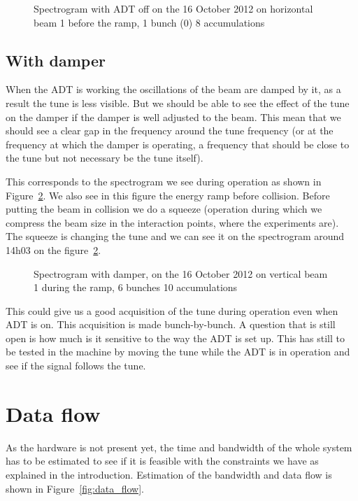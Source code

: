 \begin{figure}[H]
\caption{Spectrogram with ADT off on the 16 October 2012 on horizontal beam 1 before the ramp, 1 bunch (0) 8 accumulations}
\label{fig:bunch_0_adt_off}
\centering
\end{figure}

\subsection{With damper}

When the \gls{ADT} is working the oscillations of the beam are damped by it, as a result the tune is less visible. But we should be able to see the effect of the tune on the damper if the damper is well adjusted to the beam. This mean that we should see a clear gap in the frequency around the tune frequency (or at the frequency at which the damper is operating, a frequency that should be close to the tune but not necessary be the tune itself).

This corresponds to the spectrogram we see during operation as shown in Figure~\ref{fig:ramp}. We also see in this figure the energy ramp before collision. Before putting the beam in collision we do a squeeze (operation during which we compress the beam size in the interaction points, where the experiments are). The squeeze is changing the tune and we can see it on the spectrogram around 14h03 on the figure~\ref{fig:ramp}.

\begin{figure}[H]
\caption{Spectrogram with damper, on the 16 October 2012 on vertical beam 1 during the ramp, 6 bunches 10 accumulations}
\centering
\label{fig:ramp}
\end{figure}

This could give us a good acquisition of the \gls{tune} during operation even when \gls{ADT} is on. This acquisition is made bunch-by-bunch. A question that is still open is how much is it sensitive to the way the \gls{ADT} is set up. This has still to be tested in the machine by moving the tune while the \gls{ADT} is in operation and see if the signal follows the tune.

\section{Data flow}

As the hardware is not present yet, the time and bandwidth of the whole system has to be estimated to see if it is feasible with the constraints we have as explained in the introduction. Estimation of the bandwidth and data flow is shown in Figure~\ref{fig:data_flow}.

